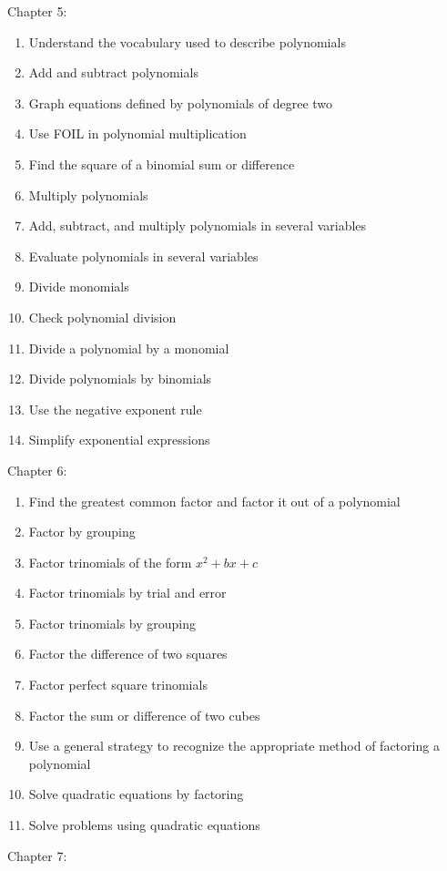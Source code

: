 \documentclass[11pt]{article}
\newenvironment{alphalist}{
\begin{enumerate}[label=(\arabic*),widest=107 ,leftmargin=25pt, itemsep=0pt]}
{\end{enumerate}}
\begin{document}
\noindent Chapter 5:
 \begin{alphalist}
    \item Understand the vocabulary used to describe polynomials
    \item Add and subtract polynomials
    \item Graph equations defined by polynomials of degree two
    \item Use FOIL in polynomial multiplication
    \item Find the square of a binomial sum or difference
    \item Multiply polynomials
    \item Add, subtract, and multiply polynomials in several variables
    \item Evaluate polynomials in several variables
    \item Divide monomials
    \item Check polynomial division
    \item Divide a polynomial by a monomial 
    \item Divide polynomials by binomials
    \item Use the negative exponent rule
    \item Simplify exponential expressions
 \end{alphalist}
\noindent Chapter 6:
 \begin{alphalist}
    \item Find the greatest common factor and factor it out of a polynomial
    \item Factor by grouping
    \item Factor trinomials of the form $x^2 + bx + c$
    \item Factor trinomials by trial and error
    \item Factor trinomials by grouping
    \item Factor the difference of two squares
    \item Factor perfect square trinomials
    \item Factor the sum or difference of two cubes
    \item Use a general strategy to recognize the appropriate method of factoring a polynomial
    \item Solve quadratic equations by factoring
    \item Solve problems using quadratic equations
 \end{alphalist}
\noindent Chapter 7:
\end{document}
